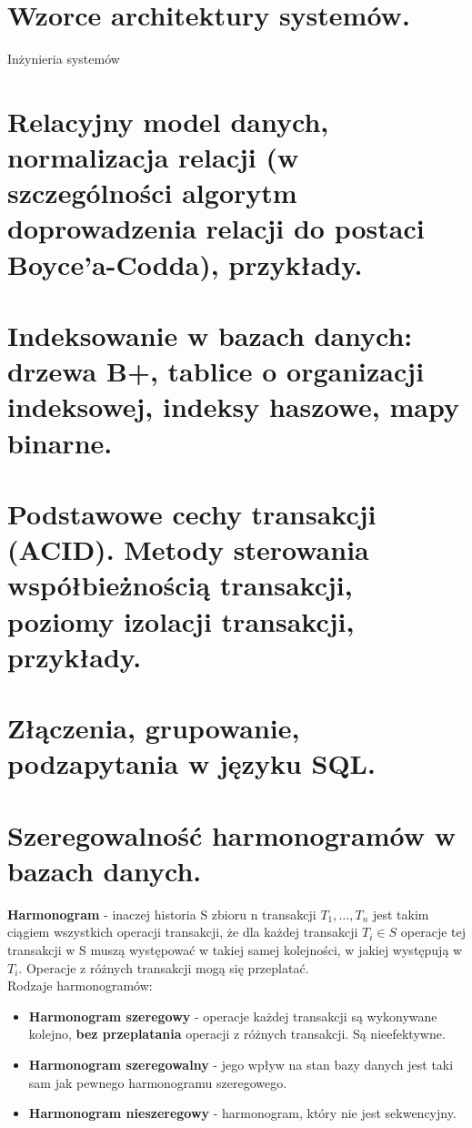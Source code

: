 \documentclass[12pt]{article}
\begin{document}
    \section{Wzorce architektury systemów.}

    {\Large Inżynieria systemów}

    \section{Relacyjny model danych, normalizacja relacji (w szczególności algorytm doprowadzenia relacji do postaci Boyce’a-Codda), przykłady.}
    \section{Indeksowanie w bazach danych: drzewa B+, tablice o organizacji indeksowej, indeksy haszowe, mapy binarne.}
    \section{Podstawowe cechy transakcji (ACID). Metody sterowania współbieżnością transakcji, poziomy izolacji transakcji, przykłady.}
    \section{Złączenia, grupowanie, podzapytania w języku SQL.}

    \newpage

    \section{Szeregowalność harmonogramów w bazach danych.}

    \begin{definition}
        \textbf{Harmonogram} - inaczej historia S zbioru n transakcji $T_1, \dots, T_n$ jest takim ciągiem wszystkich
        operacji transakcji, że dla każdej transakcji $T_i \in S$ operacje tej transakcji w S muszą występować w takiej samej
        kolejności, w jakiej występują w $T_i$. Operacje z różnych transakcji mogą się przeplatać.\\

        Rodzaje harmonogramów:
        \begin{itemize}
            \item \textbf{Harmonogram szeregowy} - operacje każdej transakcji są wykonywane kolejno, \textbf{bez przeplatania}
            operacji z różnych transakcji. Są nieefektywne.
            \item \textbf{Harmonogram szeregowalny} - jego wpływ na stan bazy danych jest taki sam jak pewnego
            harmonogramu szeregowego.
            \item \textbf{Harmonogram nieszeregowy} - harmonogram, który nie jest sekwencyjny.
        \end{itemize}
    \end{definition}
\end{document}
